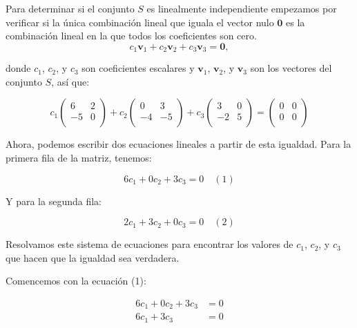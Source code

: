 \begin{itemize}
    Para determinar si el conjunto $S$ es linealmente independiente
    empezamos por verificar si la única combinación lineal 
    que iguala el vector nulo $\mathbf{0}$ es
    la combinación lineal en la que todos los coeficientes son cero.
    \[
        c_1 \mathbf{v}_1 + c_2 \mathbf{v}_2 + c_3 \mathbf{v}_3 = \mathbf{0},
    \]

    donde $c_1$, $c_2$, y $c_3$ son coeficientes escalares
    y $\mathbf{v}_1$, $\mathbf{v}_2$, y $\mathbf{v}_3$
    son los vectores del conjunto $S$, así que:    

    \[
        c_1
        \begin{pmatrix}
            6 & 2 \\
            -5 & 0 \\
        \end{pmatrix}
        +
        c_2
        \begin{pmatrix}
            0 & 3 \\
            -4 & -5 \\
        \end{pmatrix}
        +
        c_3
        \begin{pmatrix}
            3 & 0 \\
            -2 & 5 \\
        \end{pmatrix}
        =
        \begin{pmatrix}
            0 & 0 \\
            0 & 0 \\
        \end{pmatrix}
    \]

    Ahora, podemos escribir dos ecuaciones lineales a
    partir de esta igualdad. Para la primera fila de la matriz,
    tenemos:
        
    \[
        6c_1 + 0c_2 + 3c_3 = 0 \quad (1)
    \]

    Y para la segunda fila:

    \[
        2c_1 + 3c_2 + 0c_3 = 0 \quad (2)
    \]

    Resolvamos este sistema de ecuaciones para encontrar
    los valores de $c_1$, $c_2$, y $c_3$ que hacen que la
    igualdad sea verdadera.

    Comencemos con la ecuación (1):

    \begin{align*}
        6c_1 + 0c_2 + 3c_3 & = 0\\
        6c_1 + 3c_3        & = 0
    \end{align*}


\end{itemize}
